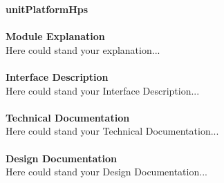 \documentclass[../../../../doc/ASP-SoC_doc/main.tex]{subfiles}
\begin{document}
\textbf{unitPlatformHps}
\\\\
\textbf{Module Explanation}
\\
Here could stand your explanation...\\
\\
\textbf{Interface Description}
\\
Here could stand your Interface Description...\\
\\
\textbf{Technical Documentation}
\\
Here could stand your Technical Documentation...\\
\\
\textbf{Design Documentation}
\\
Here could stand your Design Documentation...\\
\\
\end{document}
